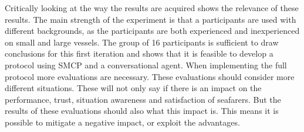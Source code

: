 Critically looking at the way the results are acquired shows the relevance of these results. The main strength of the experiment is that a participants are used with different backgrounds, as the participants are both experienced and inexperienced on small and large vessels. The group of 16 participants is sufficient to draw conclusions for this first iteration and shows that it is feasible to develop a protocol using SMCP and a conversational agent.
When implementing the full protocol more evaluations are necessary. These evaluations should consider more different situations. These will not only say if there is an impact on the performance, trust, situation awareness and satisfaction of seafarers. But the results of these evaluations should also what this impact is. This means it is possible to mitigate a negative impact, or exploit the advantages.

